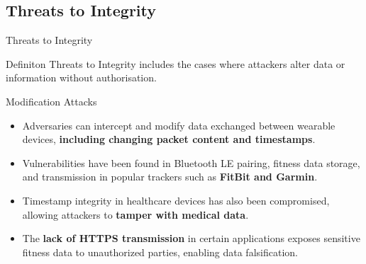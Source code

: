 \documentclass[ucs,9pt]{beamer}
\begin{document}
\subsection{Threats to Integrity}


\begin{frame}{Threats to Integrity}
	\begin{alertblock}{Definiton}
		Threats to Integrity includes the cases  where attackers alter data or information without authorisation. 
	\end{alertblock}
	
\end{frame}



\begin{frame}{Modification Attacks}
	\begin{itemize}
		\item Adversaries can intercept and modify data exchanged between wearable devices, \textbf{including changing packet content and timestamps}.
		\item Vulnerabilities have been found in Bluetooth LE pairing, fitness data storage, and transmission in popular trackers such as \textbf{FitBit and Garmin}.
		\item Timestamp integrity in healthcare devices has also been compromised, allowing attackers to \textbf{tamper with medical data}.
		\item The \textbf{lack of HTTPS transmission} in certain applications exposes sensitive fitness data to unauthorized parties, enabling data falsification.
	\end{itemize}
\end{frame}
\end{document}
